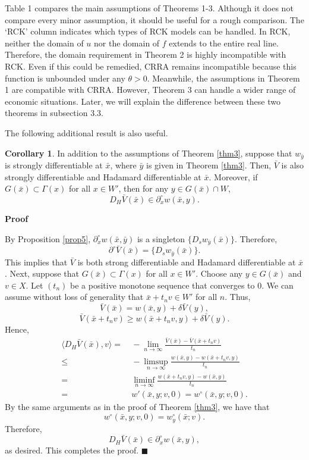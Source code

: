 \documentclass[a4paper,12pt]{article}
\makeatletter
\renewenvironment{proof}[1][\proofname]{\par
  \pushQED{\qed}%
  \normalfont \topsep6\p@\@plus6\p@\relax
  \trivlist
  \item\relax
  {\bfseries
  #1\@addpunct{.}}\hspace\labelsep\ignorespaces
}{%
  \popQED\endtrivlist\@endpefalse
}
\theoremstyle{definition}
\newtheorem{cor}{Corollary}
\renewcommand{\proofname}{Proof}
\makeatother
\begin{document}
Table 1 compares the main assumptions of Theorems 1-3. Although it does not compare every minor assumption, it should be useful for a rough comparison. The `RCK' column indicates which types of RCK models can be handled. In RCK, neither the domain of $u$ nor the domain of $f$ extends to the entire real line. Therefore, the domain requirement in Theorem 2 is highly incompatible with RCK. Even if this could be remedied, CRRA remains incompatible because this function is unbounded under any $\theta>0$. Meanwhile, the assumptions in Theorem 1 are compatible with CRRA. However, Theorem 3 can handle a wider range of economic situations. Later, we will explain the difference between these two theorems in subsection 3.3.

The following additional result is also useful.

\begin{cor}\label{cor3}
In addition to the assumptions of Theorem \ref{thm3}, suppose that $w_{\bar{y}}$ is strongly differentiable at $\bar{x}$, where $\bar{y}$ is given in Theorem \ref{thm3}. Then, $\bar{V}$ is also strongly differentiable and Hadamard differentiable at $\bar{x}$. Moreover, if $G(\bar{x})\subset \Gamma(x)$ for all $x\in W'$, then for any $y\in G(\bar{x})\cap W$, 
\[D_H\bar{V}(\bar{x})\in \partial^{\circ}_xw(\bar{x},y).\]
\end{cor}

\begin{proof}
By Proposition \ref{prop5}, $\partial^{\circ}_xw(\bar{x},\bar{y})$ is a singleton $\{D_sw_{\bar{y}}(\bar{x})\}$. Therefore,
\[\partial^{\circ}\bar{V}(\bar{x})=\{D_sw_{\bar{y}}(\bar{x})\}.\]
This implies that $\bar{V}$ is both strong differentiable and Hadamard differentiable at $\bar{x}$. Next, suppose that $G(\bar{x})\subset \Gamma(x)$ for all $x\in W'$. Choose any $y\in G(\bar{x})$ and $v\in X$. Let $(t_n)$ be a positive monotone sequence that converges to $0$. We can assume without loss of generality that $\bar{x}+t_nv\in W'$ for all $n$. Thus,
\[\bar{V}(\bar{x})=w(\bar{x},y)+\delta \bar{V}(y),\]
\[\bar{V}(\bar{x}+t_nv)\ge w(\bar{x}+t_nv,y)+\delta \bar{V}(y).\]
Hence,
\begin{align*}
\langle D_H\bar{V}(\bar{x}),v\rangle=&~-\lim_{n\to \infty}\frac{\bar{V}(\bar{x})-\bar{V}(\bar{x}+t_nv)}{t_n}\\
\le&~-\limsup_{n\to \infty}\frac{w(\bar{x},y)-w(\bar{x}+t_nv,y)}{t_n}\\
=&~\liminf_{n\to \infty}\frac{w(\bar{x}+t_nv,y)-w(\bar{x},y)}{t_n}\\
=&~w'(\bar{x},y;v,0)=w^{\circ}(\bar{x},y;v,0).
\end{align*}
By the same arguments as in the proof of Theorem \ref{thm3}, we have that
\[w^{\circ}(\bar{x},y;v,0)=w_y^{\circ}(\bar{x};v).\]
Therefore,
\[D_H\bar{V}(\bar{x})\in \partial^{\circ}_xw(\bar{x},y),\]
as desired. This completes the proof. $\blacksquare$
\end{proof}
\end{document}
